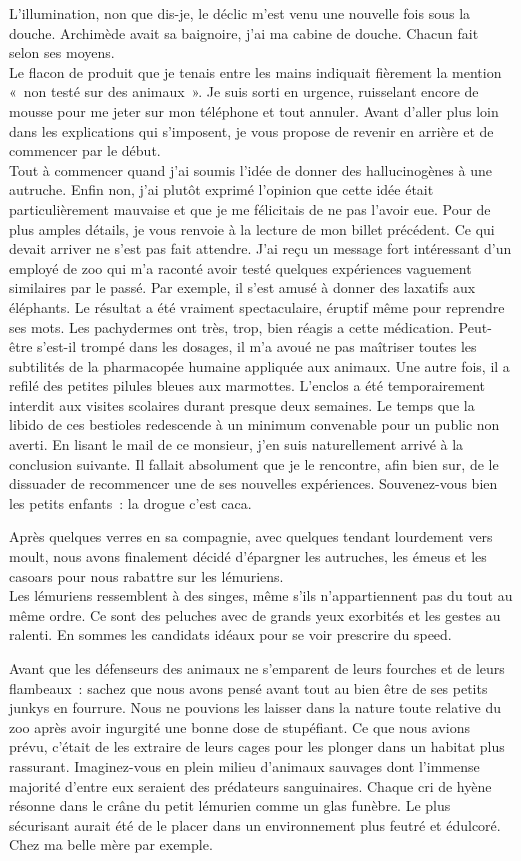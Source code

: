 ﻿L’illumination, non que dis-je, le déclic m’est venu une nouvelle fois sous la douche. Archimède avait sa baignoire, j’ai ma cabine de douche. Chacun fait selon ses moyens.\\
Le flacon de produit que je tenais entre les mains indiquait fièrement la mention « non testé sur des animaux ». Je suis sorti en urgence, ruisselant encore de mousse pour me jeter sur mon téléphone et tout annuler. Avant d’aller plus loin dans les explications qui s’imposent, je vous propose de revenir en arrière et de commencer par le début. \\
Tout à commencer quand j’ai soumis l’idée de donner des hallucinogènes à une autruche. Enfin non, j’ai plutôt exprimé l’opinion que cette idée était particulièrement mauvaise et que je me félicitais de ne pas l’avoir eue. Pour de plus amples détails, je vous renvoie à la lecture de mon billet précédent. Ce qui devait arriver ne s’est pas fait attendre. J’ai reçu un message fort intéressant d’un employé de zoo qui m’a raconté avoir testé quelques expériences vaguement similaires par le passé. Par exemple, il s’est amusé à donner des laxatifs aux éléphants. Le résultat a été vraiment spectaculaire, éruptif même pour reprendre ses mots. Les pachydermes ont très, trop, bien réagis a cette médication. Peut-être s’est-il trompé dans les dosages, il m’a avoué ne pas maîtriser toutes les subtilités de la pharmacopée humaine appliquée aux animaux. Une autre fois, il a refilé des petites pilules bleues aux marmottes. L’enclos a été temporairement interdit aux visites scolaires durant presque deux semaines. Le temps que la libido de ces bestioles redescende à un minimum convenable pour un public non averti. 
En lisant le mail de ce monsieur, j’en suis naturellement arrivé à la conclusion suivante. Il fallait absolument que je le rencontre, afin bien sur, de le dissuader de recommencer une de ses nouvelles expériences. Souvenez-vous bien les petits enfants : la drogue c’est caca. 

Après quelques verres en sa compagnie, avec quelques tendant lourdement vers moult, nous avons finalement décidé d’épargner les autruches, les émeus et les casoars pour nous rabattre sur les lémuriens.\\
Les lémuriens ressemblent à des singes, même s’ils n’appartiennent pas du tout au même ordre. Ce sont des peluches avec de grands yeux exorbités et les gestes au ralenti. En sommes les candidats idéaux pour se voir prescrire du speed.

Avant que les défenseurs des animaux ne s’emparent de leurs fourches et de leurs flambeaux : sachez que nous avons pensé avant tout au bien être de ses petits junkys en fourrure. Nous ne pouvions les laisser dans la nature toute relative du zoo après avoir ingurgité une bonne dose de stupéfiant. Ce que nous avions prévu, c’était de les extraire de leurs cages pour les plonger dans un habitat plus rassurant. Imaginez-vous en plein milieu d’animaux sauvages dont l’immense majorité d’entre eux seraient des prédateurs sanguinaires. Chaque cri de hyène résonne dans le crâne du petit lémurien comme un glas funèbre. Le plus sécurisant aurait été de le placer dans un environnement plus feutré et édulcoré. Chez ma belle mère par exemple.

